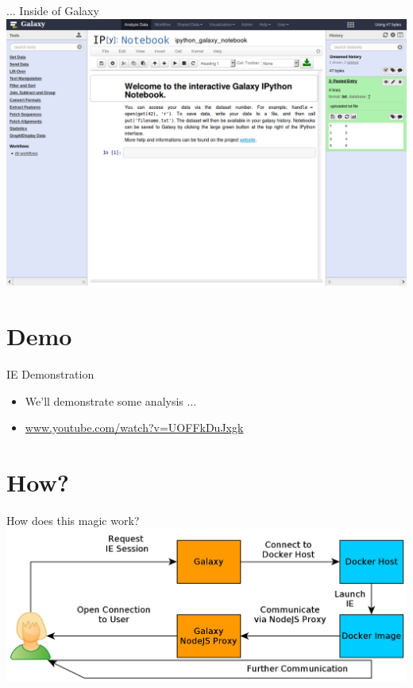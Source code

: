 \documentclass[12pt]{beamer} %
\begin{document}
\begin{frame}{... Inside of Galaxy}
    \includegraphics[width=\textwidth]{./ipy-gx.png}
\end{frame}


\section{Demo}
\begin{frame}{IE Demonstration}
	\begin{itemize}
    	\item We'll demonstrate some analysis ...
        \item \url{www.youtube.com/watch?v=UOFFkDuJxgk}
    \end{itemize}
\end{frame}

\section{How?}
  \begin{frame}{How does this magic work?}
      \centering
	  \includegraphics[width=\textwidth,height=0.8\textheight,keepaspectratio]{gx-ie.png}
  \end{frame}
\end{document}

